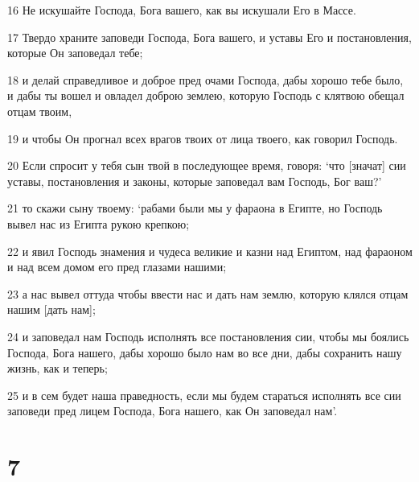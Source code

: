 \par 16 Не искушайте Господа, Бога вашего, как вы искушали Его в Массе.
\par 17 Твердо храните заповеди Господа, Бога вашего, и уставы Его и постановления, которые Он заповедал тебе;
\par 18 и делай справедливое и доброе пред очами Господа, дабы хорошо тебе было, и дабы ты вошел и овладел доброю землею, которую Господь с клятвою обещал отцам твоим,
\par 19 и чтобы Он прогнал всех врагов твоих от лица твоего, как говорил Господь.
\par 20 Если спросит у тебя сын твой в последующее время, говоря: `что [значат] сии уставы, постановления и законы, которые заповедал вам Господь, Бог ваш?'
\par 21 то скажи сыну твоему: `рабами были мы у фараона в Египте, но Господь вывел нас из Египта рукою крепкою;
\par 22 и явил Господь знамения и чудеса великие и казни над Египтом, над фараоном и над всем домом его пред глазами нашими;
\par 23 а нас вывел оттуда чтобы ввести нас и дать нам землю, которую клялся отцам нашим [дать нам];
\par 24 и заповедал нам Господь исполнять все постановления сии, чтобы мы боялись Господа, Бога нашего, дабы хорошо было нам во все дни, дабы сохранить нашу жизнь, как и теперь;
\par 25 и в сем будет наша праведность, если мы будем стараться исполнять все сии заповеди пред лицем Господа, Бога нашего, как Он заповедал нам'.

\chapter{7}

